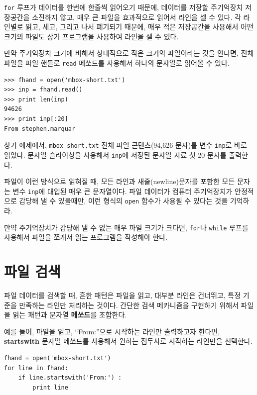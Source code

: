 {\tt for} 루프가 데이터를 한번에 한줄씩 읽어오기 때문에, 데이터를 저장할 주기억장치 저장공간을 소진하지 않고, 매우 큰 파일을 효과적으로 읽어서 라인을 셀 수 있다.
각 라인별로 읽고, 세고, 그리고 나서 폐기되기 때문에, 매우 적은 저장공간을 사용해서 어떤 크기의 파일도 상기 프로그램을 사용하여 라인을 셀 수 있다.

만약 주기억장치 크기에 비해서 상대적으로 작은 크기의 파일이라는 것을 안다면, 
전체 파일을 파일 핸들로 {\tt read} 메쏘드를 사용해서 하나의 문자열로 읽어올 수 있다.

\beforeverb
\begin{verbatim}
>>> fhand = open('mbox-short.txt')
>>> inp = fhand.read()
>>> print len(inp)
94626
>>> print inp[:20]
From stephen.marquar
\end{verbatim}
\afterverb
%

상기 예제에서, {\tt mbox-short.txt} 전체 파일 콘텐츠(94,626 문자)를 변수 {\tt inp}로 바로 읽었다.
문자열 슬라이싱을 사용해서 {\tt inp}에 저장된 문자열 자료 첫 20 문자를 출력한다.

파일이 이런 방식으로 읽혀질 때, 모든 라인과 새줄(newline)문자를 포함한 모든 문자는 변수 {\tt inp}에 대입된 매우 큰 문자열이다.
파일 데이터가 컴퓨터 주기억장치가 안정적으로 감당해 낼 수 있을때만, 
이런 형식의 {\tt open} 함수가 사용될 수 있다는 것을 기억하라.

만약 주기억장치가 감당해 낼 수 없는 매우 파일 크기가 크다면, {\tt for}나 {\tt while} 루프를 사용해서 파일을 쪼개서 읽는 프로그램을 작성해야 한다.

\section{파일 검색}

파일 데이터를 검색할 때, 흔한 패턴은 파일을 읽고, 대부분 라인은 건너뛰고, 특정 기준을 만족하는 라인만 처리하는 것이다.
간단한 검색 메카니즘을 구현하기 위해서 파일을 읽는 패턴과 문자열 {\bf 메쏘드}를 조합한다.


예를 들어, 파일을 읽고, ``From:''으로 시작하는 라인만 출력하고자 한다면, 
{\bf startswith} 문자열 메쏘드를 사용해서 원하는 접두사로 시작하는 라인만을 선택한다.

\beforeverb
\begin{verbatim}
fhand = open('mbox-short.txt')
for line in fhand:
    if line.startswith('From:') :
        print line
\end{verbatim}
\afterverb
%


